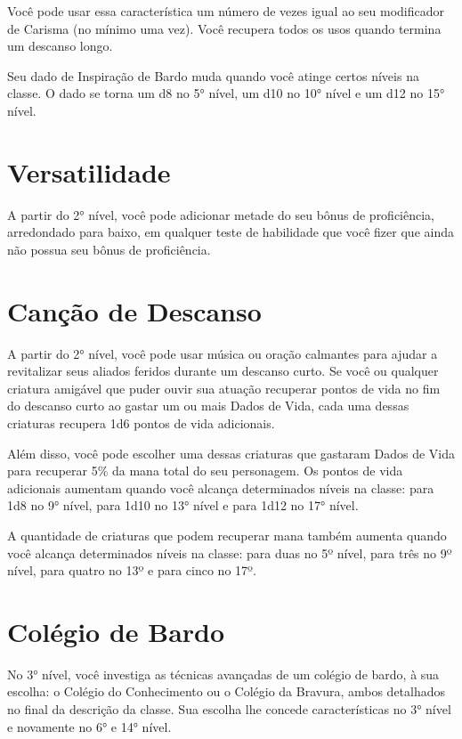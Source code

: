 \documentclass{RPG_Adventure}[2021/10/20]
\begin{document}
\begin{multicols}{2}
Você pode usar essa característica um número de vezes igual ao seu modificador
de Carisma (no mínimo uma vez). Você recupera todos os usos quando termina um
descanso longo.

Seu dado de Inspiração de Bardo muda quando você atinge certos níveis na classe.
O dado se torna um d8 no 5° nível, um d10 no 10° nível e um d12 no 15° nível.

\section*{Versatilidade}%

A partir do 2° nível, você pode adicionar metade do seu bônus de proficiência,
arredondado para baixo, em qualquer teste de habilidade que você fizer que ainda
não possua seu bônus de proficiência.

\section*{Canção de Descanso}%

A partir do 2° nível, você pode usar música ou oração calmantes para ajudar a
revitalizar seus aliados feridos durante um descanso curto. Se você ou qualquer
criatura amigável que puder ouvir sua atuação recuperar pontos de vida no fim do
descanso curto ao gastar um ou mais Dados de Vida, cada uma dessas criaturas
recupera 1d6 pontos de vida adicionais.

Além disso, você pode escolher uma dessas criaturas que gastaram Dados de Vida
para recuperar 5\% da mana total do seu personagem.
Os pontos de vida adicionais aumentam quando você alcança determinados níveis na
classe: para 1d8 no 9° nível, para 1d10 no 13° nível e para 1d12 no 17°
nível.

A quantidade de criaturas que podem recuperar mana também aumenta quando você
alcança determinados níveis na classe: para duas no 5º nível, para três no
9º nível, para quatro no 13º e para cinco no 17º.

\section*{Colégio de Bardo}%

No 3° nível, você investiga as técnicas avançadas de um colégio de bardo, à sua
escolha: o Colégio do Conhecimento ou o Colégio da Bravura, ambos detalhados no
final da descrição da classe. Sua escolha lhe concede características no 3°
nível e novamente no 6° e 14° nível.


\end{multicols}
\end{document}
